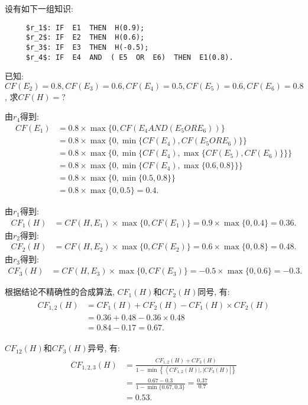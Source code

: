 \begin{example}
设有如下一组知识:
\begin{Verbatim}
     $r_1$: IF  E1  THEN  H(0.9);
     $r_2$: IF  E2  THEN  H(0.6);
     $r_3$: IF  E3  THEN  H(-0.5);
     $r_4$: IF  E4  AND  ( E5  OR  E6)  THEN  E1(0.8).
\end{Verbatim}
已知: $CF(E_2)=0.8, CF(E_3)=0.6, CF(E_4)=0.5, CF(E_5)=0.6, CF(E_6)=0.8$, 求$CF(H)=?$
\end{example}
\begin{result}
由$r_4$得到:
\begin{align*}
    CF(E_1)&=0.8\times \max\{ 0, CF(E_4  AND  (E_5  OR   E_6)) \}\\
          &=0.8\times \max\{ 0, \min\{CF(E_4),  CF(E_5  OR   E_6)\} \}\\
          &=0.8\times \max\{ 0, \min\{CF(E_4),  \max\{CF(E_5),  CF(E_6)\}\} \}\\
          &=0.8\times \max\{ 0, \min\{CF(E_4),  \max\{0.6,  0.8\}\} \}\\
          &=0.8\times \max\{ 0, \min\{0.5,  0.8\} \}\\
          &=0.8\times \max\{ 0,  0.5 \} = 0.4.
\end{align*}
\end{result}
由$r_1$得到:
\begin{align*}
CF_1(H)&=CF(H, E_1)\times \max\{0,  CF(E_1)\}=0.9\times \max\{0,  0.4\} = 0.36.
\end{align*}
    由$r_2$得到:
\begin{align*}
CF_2(H)&=CF(H, E_2)\times \max\{0,  CF(E_2)\}=0.6\times \max\{0,  0.8\} = 0.48.
\end{align*}
由$r_3$得到:
\begin{align*}
CF_3(H)&=CF(H, E_3)\times \max\{0,  CF(E_3)\}=-0.5\times \max\{0,  0.6\} = -0.3.
\end{align*}

根据结论不精确性的合成算法, $CF_1(H)$和$CF_2(H)$同号, 有:
\begin{align}
  \begin{aligned}
  C F_{1,2}(H) &=C F_{1}(H)+C F_{2}(H)-C F_{1}(H) \times C F_{2}(H) \\
  &=0.36+0.48-0.36 \times 0.48 \\
  &=0.84-0.17=0.67.
  \end{aligned}
\end{align}

$CF_{12}(H)$和$CF_3(H)$异号, 有:
\begin{align}
  \begin{aligned}
  C F_{1,2,3}(H) &=\frac{C F_{1,2}(H)+C F_{3}(H)}{1-\min \left\{\left\langle C F_{1,2}(H)|,| C F_{3}(H)\right|\right\}} \\
  &=\frac{0.67-0.3}{1-\min\{0.67,0.3\}}=\frac{0.37}{0.7} \\
  &=0.53.
  \end{aligned}
\end{align}
